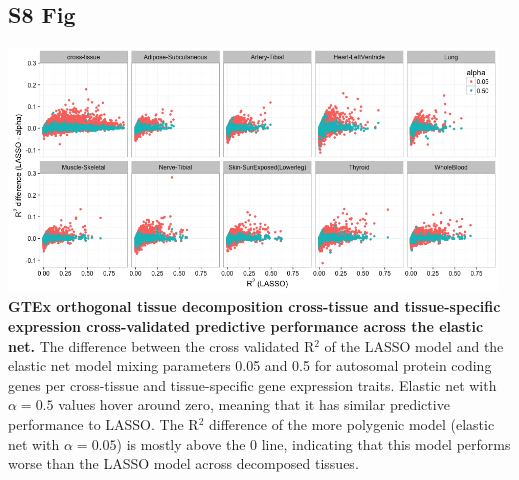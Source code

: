 \documentclass[10pt,letterpaper]{article}
\begin{document}
\begin{singlespace}
\subsection*{S8 Fig}
\includegraphics[width=13cm]{Figures/GenArch_Supp/S7Fig.png}
\label{S8_Fig}
{\bf GTEx orthogonal tissue decomposition cross-tissue and tissue-specific expression cross-validated predictive performance across the elastic net.} The difference between the cross validated R$^2$ of the LASSO model and the elastic net model mixing parameters 0.05 and 0.5 for autosomal protein coding genes per cross-tissue and tissue-specific gene expression traits. Elastic net with $\alpha=0.5$ values hover around zero, meaning that it has similar predictive performance to LASSO. The R$^2$ difference of the more polygenic model (elastic net with $\alpha=0.05$) is mostly above the 0 line, indicating that this model performs worse than the LASSO model across decomposed tissues.
\end{singlespace}

\pagebreak
\end{document}
